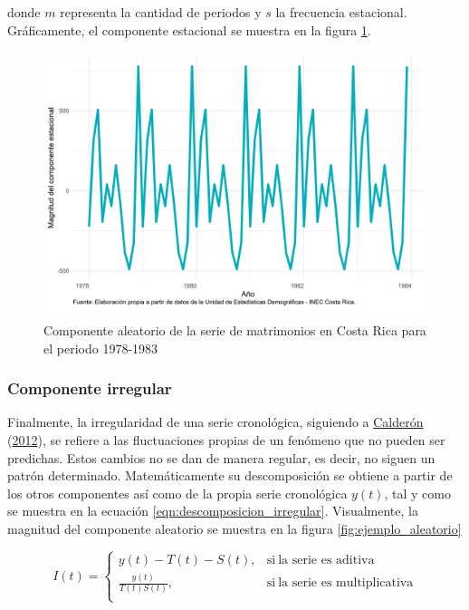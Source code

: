 \documentclass[
]{article}
\begin{document}
donde \(m\) representa la cantidad de periodos y \(s\) la frecuencia
estacional. Gráficamente, el componente estacional se muestra en la
figura \ref{fig:ejemplo_estacional}.

\begin{figure}[H]
\includegraphics[width=1\linewidth,height=1\textheight]{Tesis_files/figure-latex/ejemplo_estacional-1} \caption{Componente aleatorio de la serie de matrimonios en Costa Rica para el periodo 1978-1983}\label{fig:ejemplo_estacional}
\end{figure}

\subsubsection{Componente irregular}

Finalmente, la irregularidad de una serie cronológica, siguiendo a
\protect\hyperlink{ref-calderon2012estadistica}{Calderón}
(\protect\hyperlink{ref-calderon2012estadistica}{2012}), se refiere a
las fluctuaciones propias de un fenómeno que no pueden ser predichas.
Estos cambios no se dan de manera regular, es decir, no siguen un patrón
determinado. Matemáticamente su descomposición se obtiene a partir de
los otros componentes así como de la propia serie cronológica \(y(t)\),
tal y como se muestra en la ecuación \ref{eqn:descomposicion_irregular}.
Visualmente, la magnitud del componente aleatorio se muestra en la
figura \ref{fig:ejemplo_aleatorio}

\begin{equation}
\label{eqn:descomposicion_irregular}
I(t)=
\begin{cases}
y(t)-T(t)-S(t), & \text{si}\ \text{la serie es aditiva} \\
\frac{y(t)}{T(t)S(t)} , & \text{si}\ \text{la serie es multiplicativa} \\
\end{cases}
\end{equation}
\end{document}
